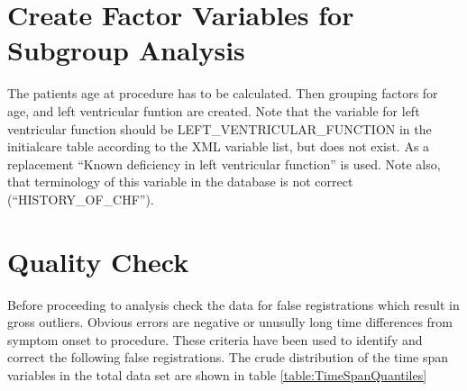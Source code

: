 \documentclass[a4paper]{report}
\begin{document}
\section{Create Factor Variables for Subgroup Analysis}
The patients age at procedure has to be calculated. Then grouping factors for age, and left ventricular funtion are created. Note that the variable for left ventricular function should be LEFT\_VENTRICULAR\_FUNCTION in the initialcare table according to the XML variable list, but does not exist. As a replacement ``Known deficiency in left ventricular function'' is used. Note also, that terminology of this variable in the database is not correct (``HISTORY\_OF\_CHF'').

\begin{Schunk}
\end{Schunk}



\section{Quality Check}
Before proceeding to analysis check the data for false registrations which result in gross outliers. Obvious errors are negative or unusully long time differences from symptom onset to procedure. These criteria have been used to identify and correct the following false registrations. The crude distribution of the time span variables in the total data set are shown in table \ref{table:TimeSpanQuantiles}
\end{document}
